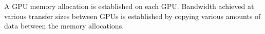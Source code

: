 A GPU memory allocation is established on each GPU.
Bandwidth achieved at various transfer sizes between GPUs is established by copying various amounts of data between the memory allocations.


